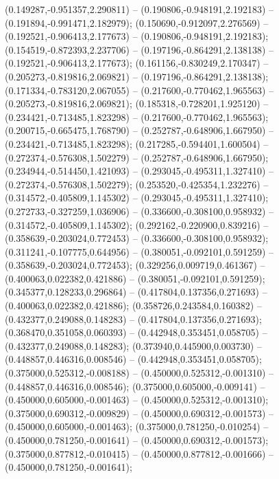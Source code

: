  (0.149287,-0.951357,2.290811) -- (0.190806,-0.948191,2.192183) -- (0.191894,-0.991471,2.182979);
 (0.150690,-0.912097,2.276569) -- (0.192521,-0.906413,2.177673) -- (0.190806,-0.948191,2.192183);
 (0.154519,-0.872393,2.237706) -- (0.197196,-0.864291,2.138138) -- (0.192521,-0.906413,2.177673);
 (0.161156,-0.830249,2.170347) -- (0.205273,-0.819816,2.069821) -- (0.197196,-0.864291,2.138138);
 (0.171334,-0.783120,2.067055) -- (0.217600,-0.770462,1.965563) -- (0.205273,-0.819816,2.069821);
 (0.185318,-0.728201,1.925120) -- (0.234421,-0.713485,1.823298) -- (0.217600,-0.770462,1.965563);
 (0.200715,-0.665475,1.768790) -- (0.252787,-0.648906,1.667950) -- (0.234421,-0.713485,1.823298);
 (0.217285,-0.594401,1.600504) -- (0.272374,-0.576308,1.502279) -- (0.252787,-0.648906,1.667950);
 (0.234944,-0.514450,1.421093) -- (0.293045,-0.495311,1.327410) -- (0.272374,-0.576308,1.502279);
 (0.253520,-0.425354,1.232276) -- (0.314572,-0.405809,1.145302) -- (0.293045,-0.495311,1.327410);
 (0.272733,-0.327259,1.036906) -- (0.336600,-0.308100,0.958932) -- (0.314572,-0.405809,1.145302);
 (0.292162,-0.220900,0.839216) -- (0.358639,-0.203024,0.772453) -- (0.336600,-0.308100,0.958932);
 (0.311241,-0.107775,0.644956) -- (0.380051,-0.092101,0.591259) -- (0.358639,-0.203024,0.772453);
 (0.329256,0.009719,0.461367) -- (0.400063,0.022382,0.421886) -- (0.380051,-0.092101,0.591259);
 (0.345377,0.128233,0.296864) -- (0.417804,0.137356,0.271693) -- (0.400063,0.022382,0.421886);
 (0.358726,0.243584,0.160382) -- (0.432377,0.249088,0.148283) -- (0.417804,0.137356,0.271693);
 (0.368470,0.351058,0.060393) -- (0.442948,0.353451,0.058705) -- (0.432377,0.249088,0.148283);
 (0.373940,0.445900,0.003730) -- (0.448857,0.446316,0.008546) -- (0.442948,0.353451,0.058705);
 (0.375000,0.525312,-0.008188) -- (0.450000,0.525312,-0.001310) -- (0.448857,0.446316,0.008546);
 (0.375000,0.605000,-0.009141) -- (0.450000,0.605000,-0.001463) -- (0.450000,0.525312,-0.001310);
 (0.375000,0.690312,-0.009829) -- (0.450000,0.690312,-0.001573) -- (0.450000,0.605000,-0.001463);
 (0.375000,0.781250,-0.010254) -- (0.450000,0.781250,-0.001641) -- (0.450000,0.690312,-0.001573);
 (0.375000,0.877812,-0.010415) -- (0.450000,0.877812,-0.001666) -- (0.450000,0.781250,-0.001641);
